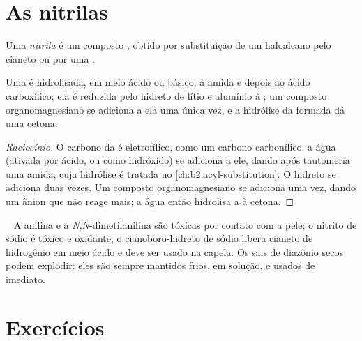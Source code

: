 \section{As nitrilas}

\begin{definition}[Nitrila]\label{def:b2:amines:nitrile}
Uma \emph{nitrila} é um composto , obtido por substituição de
um haloalcano pelo cianeto ou por uma .
\end{definition}

\begin{proposition}\label{prop:b2:amines:nitrile}
Uma  é hidrolisada, em meio ácido ou básico, à amida e depois ao ácido
carboxílico; ela é reduzida pelo hidreto de lítio e alumínio à 
; um composto organomagnesiano se adiciona a ela uma única vez, e a
hidrólise da  formada dá uma cetona.
\end{proposition}

\begin{proof}[Raciocínio]
O carbono da  é eletrofílico, como um carbono carbonílico: a água
(ativada por ácido, ou como hidróxido) se adiciona a ele, dando após
tautomeria uma amida, cuja hidrólise é tratada no
\cref{ch:b2:acyl-substitution}. O hidreto se adiciona duas vezes. Um composto
organomagnesiano se adiciona uma vez, dando um ânion  que não reage mais;
a água então hidrolisa a  à cetona.
\end{proof}

\begin{safety}{\,\,\,}
A anilina e a \textit{N},\textit{N}-dimetilanilina são tóxicas por contato com a
pele; o nitrito de sódio é tóxico e oxidante; o cianoboro-hidreto de sódio
libera cianeto de hidrogênio em meio ácido e deve ser usado na capela. Os sais
de diazônio secos podem explodir: eles são sempre mantidos frios, em solução, e
usados de imediato.
\end{safety}

\section{Exercícios}

